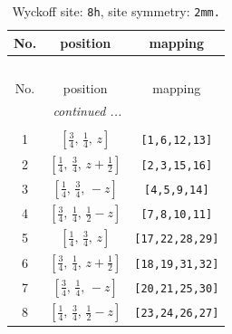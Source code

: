 \documentclass[fleqn,8pt]{jsarticle}
\begin{document}
\begin{longtable}{ccc}
\caption{Wyckoff site: {\tt 8h}, site symmetry: {\tt 2mm.}}
 \\
 \hline \hline
No. & position & mapping \\ \hline \endfirsthead

\multicolumn{2}{l}{\tablename\ \thetable{}} \\
 \hline \hline
No. & position & mapping \\ \hline \endhead

 \hline \hline
\multicolumn{2}{r}{\footnotesize\it continued ...} \\ \endfoot

 \hline \hline
\multicolumn{2}{r}{} \\ \endlastfoot

1 & $\left[ \frac{3}{4},\, \frac{1}{4},\, z \right]$ & {\tt [1,6,12,13]} \\ \hline
2 & $\left[ \frac{1}{4},\, \frac{3}{4},\, z + \frac{1}{2} \right]$ & {\tt [2,3,15,16]} \\ \hline
3 & $\left[ \frac{1}{4},\, \frac{3}{4},\, - z \right]$ & {\tt [4,5,9,14]} \\ \hline
4 & $\left[ \frac{3}{4},\, \frac{1}{4},\, \frac{1}{2} - z \right]$ & {\tt [7,8,10,11]} \\ \hline
5 & $\left[ \frac{1}{4},\, \frac{3}{4},\, z \right]$ & {\tt [17,22,28,29]} \\ \hline
6 & $\left[ \frac{3}{4},\, \frac{1}{4},\, z + \frac{1}{2} \right]$ & {\tt [18,19,31,32]} \\ \hline
7 & $\left[ \frac{3}{4},\, \frac{1}{4},\, - z \right]$ & {\tt [20,21,25,30]} \\ \hline
8 & $\left[ \frac{1}{4},\, \frac{3}{4},\, \frac{1}{2} - z \right]$ & {\tt [23,24,26,27]} \\
\end{longtable}
\renewcommand{\arraystretch}{1.2}
\end{document}
